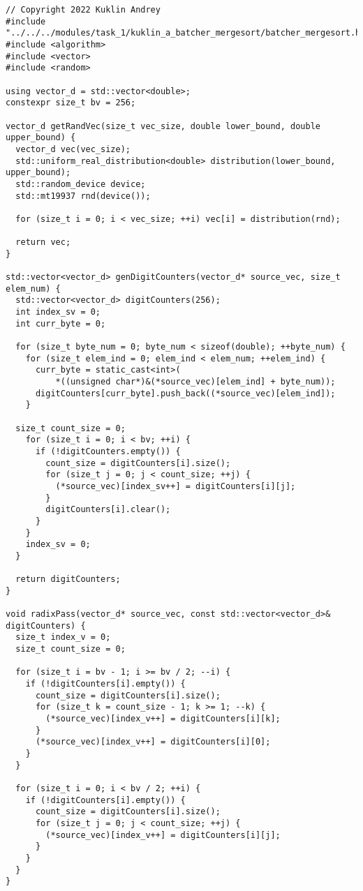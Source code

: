 \documentclass{report}
\begin{document}
\begin{lstlisting}
// Copyright 2022 Kuklin Andrey
#include "../../../modules/task_1/kuklin_a_batcher_mergesort/batcher_mergesort.h"
#include <algorithm>
#include <vector>
#include <random>

using vector_d = std::vector<double>;
constexpr size_t bv = 256;

vector_d getRandVec(size_t vec_size, double lower_bound, double upper_bound) {
  vector_d vec(vec_size);
  std::uniform_real_distribution<double> distribution(lower_bound, upper_bound);
  std::random_device device;
  std::mt19937 rnd(device());

  for (size_t i = 0; i < vec_size; ++i) vec[i] = distribution(rnd);

  return vec;
}

std::vector<vector_d> genDigitCounters(vector_d* source_vec, size_t elem_num) {
  std::vector<vector_d> digitCounters(256);
  int index_sv = 0;
  int curr_byte = 0;

  for (size_t byte_num = 0; byte_num < sizeof(double); ++byte_num) {
    for (size_t elem_ind = 0; elem_ind < elem_num; ++elem_ind) {
      curr_byte = static_cast<int>(
          *((unsigned char*)&(*source_vec)[elem_ind] + byte_num));
      digitCounters[curr_byte].push_back((*source_vec)[elem_ind]);
    }

  size_t count_size = 0;
    for (size_t i = 0; i < bv; ++i) {
      if (!digitCounters.empty()) {
        count_size = digitCounters[i].size();
        for (size_t j = 0; j < count_size; ++j) {
          (*source_vec)[index_sv++] = digitCounters[i][j];
        }
        digitCounters[i].clear();
      }
    }
    index_sv = 0;
  }

  return digitCounters;
}

void radixPass(vector_d* source_vec, const std::vector<vector_d>& digitCounters) {
  size_t index_v = 0;
  size_t count_size = 0;

  for (size_t i = bv - 1; i >= bv / 2; --i) {
    if (!digitCounters[i].empty()) {
      count_size = digitCounters[i].size();
      for (size_t k = count_size - 1; k >= 1; --k) {
        (*source_vec)[index_v++] = digitCounters[i][k];
      }
      (*source_vec)[index_v++] = digitCounters[i][0];
    }
  }

  for (size_t i = 0; i < bv / 2; ++i) {
    if (!digitCounters[i].empty()) {
      count_size = digitCounters[i].size();
      for (size_t j = 0; j < count_size; ++j) {
        (*source_vec)[index_v++] = digitCounters[i][j];
      }
    }
  }
}


\end{lstlisting}
\end{document}
